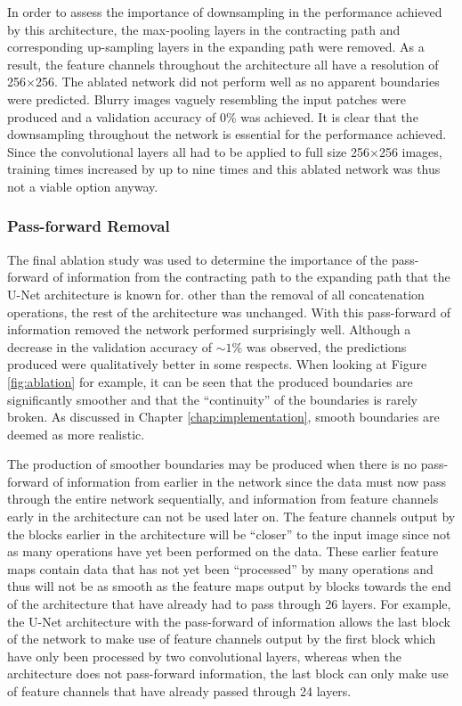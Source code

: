 In order to assess the importance of downsampling in the performance achieved by this architecture, the max-pooling layers in the contracting path and corresponding up-sampling layers in the expanding path were removed. As a result, the feature channels throughout the architecture all have a resolution of 256$\times$256. The ablated network did not perform well as no apparent boundaries were predicted. Blurry images vaguely resembling the input patches were produced and a validation accuracy of 0\% was achieved. It is clear that the downsampling throughout the network is essential for the performance achieved. Since the convolutional layers all had to be applied to full size 256$\times$256 images, training times increased by up to nine times and this ablated network was thus not a viable option anyway.

\subsubsection{Pass-forward Removal}

The final ablation study was used to determine the importance of the pass-forward of information from the contracting path to the expanding path that the U-Net architecture is known for. other than the removal of all concatenation operations, the rest of the architecture was unchanged. With this pass-forward of information removed the network performed surprisingly well. Although a decrease in the validation accuracy of ${\sim}1\%$ was observed, the predictions produced were qualitatively better in some respects. When looking at Figure \ref{fig:ablation} for example, it can be seen that the produced boundaries are significantly smoother and that the ``continuity'' of the boundaries is rarely broken. As discussed in Chapter \ref{chap:implementation}, smooth boundaries are deemed as more realistic.

The production of smoother boundaries may be produced when there is no pass-forward of information from earlier in the network since the data must now pass through the entire network sequentially, and information from feature channels early in the architecture can not be used later on. The feature channels output by the blocks earlier in the architecture will be ``closer'' to the input image since not as many operations have yet been performed on the data. These earlier feature maps contain data that has not yet been ``processed'' by many operations and thus will not be as smooth as the feature maps output by blocks towards the end of the architecture that have already had to pass through 26 layers. For example, the U-Net architecture with the pass-forward of information allows the last block of the network to make use of feature channels output by the first block which have only been processed by two convolutional layers, whereas when the architecture does not pass-forward information, the last block can only make use of feature channels that have already passed through 24 layers.

